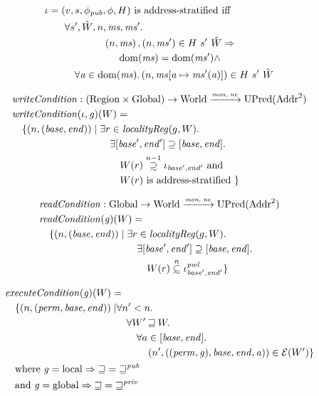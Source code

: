 \documentclass[compsoc,conference,letterpaper,fleqn]{IEEEtran}
\newcommand{\update}[2]{[#1 \mapsto #2]}
\newcommand{\monnefun}{\xrightarrow{\textit{\tiny{mon, ne}}}}
\newcommand{\fun}{\rightarrow}
\newcommand\subsetsim{\mathrel{\ooalign{\raise.2ex\hbox{$\subset$}\cr
      \hidewidth\lower.8ex\hbox{\scalebox{0.9}{$\sim$}}\hidewidth\cr}}}
\newcommand\supsetsim{\mathrel{\ooalign{\raise.2ex\hbox{$\supset$}\cr
      \hidewidth\lower.8ex\hbox{\scalebox{0.9}{$\sim$}}\hidewidth\cr}}}
\newcommand{\nsubsim}[1][n]{\stackrel{\tiny{#1}}{\subsetsim}}
\newcommand{\nsupsim}[1][n]{\stackrel{\tiny{#1}}{\supsetsim}}
\DeclareMathOperator{\dom}{dom}
\newcommand{\var}[1]{\mathit{#1}}
\newcommand{\hs}{\var{ms}}
\newcommand{\ms}{\hs}
\newcommand{\gl}{\var{g}}
\newcommand{\addr}{\var{a}}
\newcommand{\start}{\var{base}}
\newcommand{\addrend}{\var{end}}
\newcommand{\perm}{\var{perm}}
\newcommand{\pwl}{\var{pwl}}
\newcommand{\plainfun}[2]{
  \ifthenelse{\equal{#2}{}}
  {\mathit{#1}}
  {\mathit{#1}(#2)}
}
\newcommand{\readCond}[1]{\plainfun{readCondition}{#1}}
\newcommand{\writeCond}[1]{\plainfun{writeCondition}{#1}}
\newcommand{\execCond}[1]{\plainfun{executeCondition}{#1}}
\newcommand{\future}{\mathbin{\sqsupseteq}}
\newcommand{\pub}{\var{pub}}
\newcommand{\futurewk}{\mathbin{\sqsupseteq}^{\var{pub}}}
\newcommand{\futurestr}{\mathbin{\sqsupseteq}^{\var{priv}}}
\newcommand{\asmType}{\plaindom{AsmType}}
\newcommand{\plaindom}[1]{\mathrm{#1}}
\newcommand{\Addrs}{\plaindom{Addr}}
\newcommand{\Globals}{\plaindom{Global}}
\newcommand{\Regions}{\plaindom{Region}}
\newcommand{\Worlds}{\plaindom{World}}
\newcommand{\UPred}[1]{\plaindom{UPred}(#1)}
\newcommand{\intr}[2]{\mathcal{#1}}
\newcommand{\exprintr}[1]{\intr{E}{#1}}
\newcommand{\stder}{\exprintr{\asmType}}
\newcommand{\npair}[2][n]{\left(#1,#2 \right)}
\newcommand{\plainperm}[1]{\mathrm{#1}}
\newcommand{\local}{\plainperm{local}}
\newcommand{\glob}{\plainperm{global}}
\begin{document}
\begin{align*}
&\iota = (v,s,\phi_\pub,\phi,H) \text{ is address-stratified iff }\\
&\qquad\begin{multlined}
  \forall s', \hat{W}, n, \ms, \ms' \ldotp \\
  \npair{\ms},\npair{\ms'} \in H~ s'~ \hat{W} \Rightarrow \\
  \dom(\ms) = \dom(\ms') \wedge \\
  \forall \addr \in
  \dom(\ms)\ldotp \npair{\ms\update{\addr}{\ms'(\addr)}} \in H~ s'~ \hat{W}
\end{multlined}
\end{align*}

\begin{align*}
  & \writeCond{} : (\Regions \times \Globals) \fun \Worlds \monnefun \UPred{\Addrs^2}  \\
  & \writeCond{}(\iota,\gl)(W) =  \\
  & \quad \begin{aligned}[t]
    \{ \npair{(\start,\addrend)} \mid & \;\exists r \in \var{localityReg}(g,W) \ldotp \\
    & \;\quad \exists [\start',\addrend'] \supseteq [\start,\addrend] \ldotp \\
    & \;\qquad W(r)\nsupsim[n-1] \iota_{\start',\addrend'} \text{ and }\\
    & \;\qquad W(r) \text{ is address-stratified } \}
  \end{aligned}
\end{align*}

\begin{align*}
  & \readCond{} : \Globals \fun \Worlds \monnefun \UPred{\Addrs^2}  \\
  & \readCond{}(\gl)(W) =  \\
  & \quad \begin{aligned}[t]
    \{ \npair{(\start,\addrend)} \mid & \;\exists r \in \var{localityReg}(g,W) \ldotp \\
    & \;\quad \exists [\start',\addrend'] \supseteq [\start,\addrend] \ldotp \\
    & \;\qquad W(r)\nsubsim[n] \iota_{\start',\addrend'}^\pwl \}
  \end{aligned}
\end{align*}

\begin{align*}
  & \execCond{}(\gl)(W) = \\
  & \quad
    \begin{aligned}[t]
      \{ \npair{(\perm,\start,\addrend)} \mid &  \forall n' < n \ldotp\\
      & \quad \forall W' \future W \ldotp\\
      & \qquad\forall a \in [\start,\addrend] \ldotp\\
      & \qquad \quad \npair[n']{((\perm,\gl),\start,\addrend,\addr)} \in \stder(W')\}
    \end{aligned} \\
  & \quad \text{where } \gl = \local \Rightarrow \future = \futurewk \\
  & \quad \text{and } \gl = \glob \Rightarrow \future = \futurestr
\end{align*}
\end{document}
